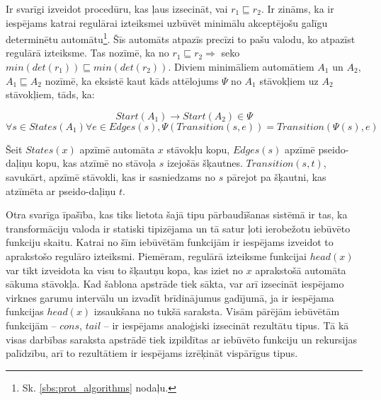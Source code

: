 Ir svarīgi izveidot procedūru, kas ļaus izsecināt, vai $r_1 {\sqsubseteq} r_2$. Ir zināms, ka ir iespējams katrai regulārai izteiksmei uzbūvēt minimālu akceptējošu galīgu determinētu automātu\footnote{Sk. \ref{sbs:prot_algorithms} nodaļu.}. Šīs automāts atpazīs precīzi to pašu valodu, ko atpazīst regulārā izteiksme. Tas nozīmē, ka no $r_1 \sqsubseteq r_2 \Rightarrow$ seko $min(det (r_1)) \sqsubseteq min (det (r_2))$. Diviem minimāliem automātiem $A_1$ un $A_2$, $A_1 \sqsubseteq A_2$ nozīmē, ka eksistē kaut kāds attēlojums $\Psi$ no $A_1$ stāvokļiem uz $A_2$ stāvokļiem, tāds, ka:

\[
    Start (A_1) \to Start (A_2) \in \Psi
\]
\[
    \forall s \in States (A_1) \forall e \in Edges (s),
    \Psi (Transition (s, e)) = Transition (\Psi (s), e)
\]

Šeit $States (x)$ apzīmē automāta $x$ stāvokļu kopu, $Edges (s)$ apzīmē pseido-daļiņu kopu, kas atzīmē no stāvoļa $s$ izejošās šķautnes. $Transition(s, t)$, savukārt, apzīmē stāvokli, kas ir sasniedzams no $s$ pārejot pa šķautni, kas atzīmēta ar pseido-daļiņu $t$.

Otra svarīga īpašība, kas tiks lietota šajā tipu pārbaudīšanas sistēmā ir tas, ka transformāciju valoda ir statiski tipizējama un tā satur ļoti ierobežotu iebūvēto funkciju skaitu. Katrai no šīm iebūvētām funkcijām ir iespējams izveidot to aprakstošo regulāro izteiksmi. Piemēram, regulārā izteiksme funkcijai $head (x)$ var tikt izveidota ka visu to šķautņu kopa, kas iziet no $x$ aprakstošā automāta sākuma stāvokļa. Kad šablona apstrāde tiek sākta, var arī izsecināt iespējamo virknes garumu intervālu un izvadīt brīdinājumus gadījumā, ja ir iespējama funkcijas $head (x)$ izsaukšana no tukšā saraksta. Visām pārējām iebūvētām funkcijām -- $cons$, $tail$ -- ir iespējams analoģiski izsecināt rezultātu tipus. Tā kā visas darbības saraksta apstrādē tiek izpildītas ar iebūvēto funkciju un rekursijas palīdzību, arī to rezultātiem ir iespējams izrēķināt vispārīgus tipus.